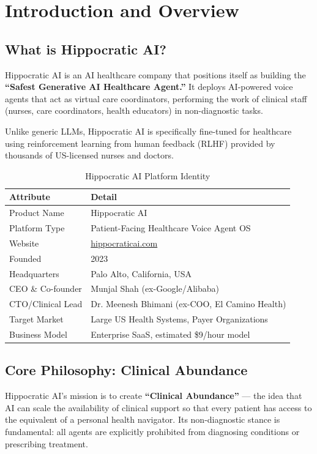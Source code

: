 \documentclass[12pt,a4paper]{article}
\begin{document}
\section{Introduction and Overview}

\subsection{What is Hippocratic AI?}
Hippocratic AI is an AI healthcare company that positions itself as building the \textbf{``Safest Generative AI Healthcare Agent.''} It deploys AI-powered voice agents that act as virtual care coordinators, performing the work of clinical staff (nurses, care coordinators, health educators) in non-diagnostic tasks.

Unlike generic LLMs, Hippocratic AI is specifically fine-tuned for healthcare using reinforcement learning from human feedback (RLHF) provided by thousands of US-licensed nurses and doctors.

\begin{table}[H]
\centering
\renewcommand{\arraystretch}{1.4}
\begin{tabularx}{\textwidth}{lX}
\toprule
\textbf{Attribute} & \textbf{Detail} \\
\midrule
Product Name     & Hippocratic AI \\
Platform Type    & Patient-Facing Healthcare Voice Agent OS \\
Website          & \href{https://hippocraticai.com}{hippocraticai.com} \\
Founded          & 2023 \\
Headquarters     & Palo Alto, California, USA \\
CEO \& Co-founder & Munjal Shah (ex-Google/Alibaba) \\
CTO/Clinical Lead & Dr. Meenesh Bhimani (ex-COO, El Camino Health) \\
Target Market    & Large US Health Systems, Payer Organizations \\
Business Model   & Enterprise SaaS, estimated \$9/hour model \\
\bottomrule
\end{tabularx}
\caption{Hippocratic AI Platform Identity}
\end{table}

\subsection{Core Philosophy: Clinical Abundance}
Hippocratic AI's mission is to create \textbf{``Clinical Abundance''} --- the idea that AI can scale the availability of clinical support so that every patient has access to the equivalent of a personal health navigator. Its non-diagnostic stance is fundamental: all agents are explicitly prohibited from diagnosing conditions or prescribing treatment.
\end{document}
